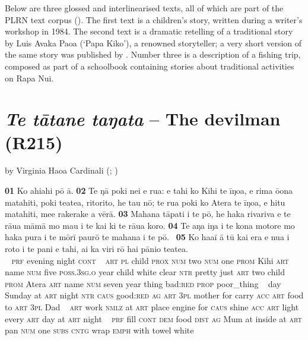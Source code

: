 
Below are three glossed and interlinearised texts, all of which are part of the PLRN text corpus (). The first text is a children’s story, written during a writer’s workshop in 1984. The second text is a dramatic retelling of a traditional story by Luis Avaka Paoa (‘Papa Kiko’), a renowned storyteller; a very short version of the same story was published by \citet{Blixen1974}. Number three is a description of a fishing trip, composed as part of a schoolbook containing stories about traditional activities on Rapa Nui.

\section*{\textit{Te tātane taŋata} – The devilman (R215)}\label{sec:a.1}

by Virginia Haoa Cardinali (\citealt{HaoaCardinali1984}; \citealt[Vol. 3:118–119]{WeberWeber1990Mai})

\bigskip\gll
\textbf{\textup{01}} Ko ahiahi pō {\ꞌ}ā. \textbf{\textup{02}} Te ŋā poki nei e rua: e tahi ko Kihi te {\ꞌ}īŋoa, e rima ō{\ꞌ}ona matahiti, poki teatea, ritorito, he tau nō; te rua poki ko {\ꞌ}Atera te {\ꞌ}īŋoa, e hitu matahiti, me{\ꞌ}e rakerake a vērā. \textbf{\textup{03}} Mahana tāpati {\ꞌ}i te pō, he haka rivariva e te rāua māmā mo ma{\ꞌ}u i te kai ki te rāua koro. \textbf{\textup{04}} Te aŋa iŋa {\ꞌ}i te kona motore mo haka pura i te mōrī paurō te mahana {\ꞌ}i te pō. ~\textbf{\textup{05}} Ko ha{\ꞌ}a{\ꞌ}ī {\ꞌ}ā tū kai era e nua {\ꞌ}i roto i te pani e tahi, {\ꞌ}ai ka viri rō hai pānio teatea.\\ 
~ \textsc{prf} evening night \textsc{cont} ~  \textsc{art} \textsc{pl} child \textsc{prox} \textsc{num} two \textsc{num} one \textsc{prom} Kihi \textsc{art} name \textsc{num} five \textsc{poss.3sg.o} year child white clear \textsc{ntr} pretty just \textsc{art} two child \textsc{prom} Atera \textsc{art} name \textsc{num} seven year thing bad:\textsc{red} \textsc{prop} poor\_thing ~ day Sunday at \textsc{art} night \textsc{ntr} \textsc{caus} good:\textsc{red} \textsc{ag} \textsc{art} \textsc{3pl} mother for carry \textsc{acc} \textsc{art} food to \textsc{art} \textsc{3pl} Dad ~  \textsc{art} work \textsc{nmlz} at \textsc{art} place engine for \textsc{caus} shine \textsc{acc} \textsc{art} light every \textsc{art} day at \textsc{art} night ~ \textsc{prf} fill \textsc{cont} \textsc{dem} food \textsc{dist} \textsc{ag} Mum at inside at \textsc{art} pan \textsc{num} one \textsc{subs} \textsc{cntg} wrap \textsc{emph} with towel white\\ 
 
